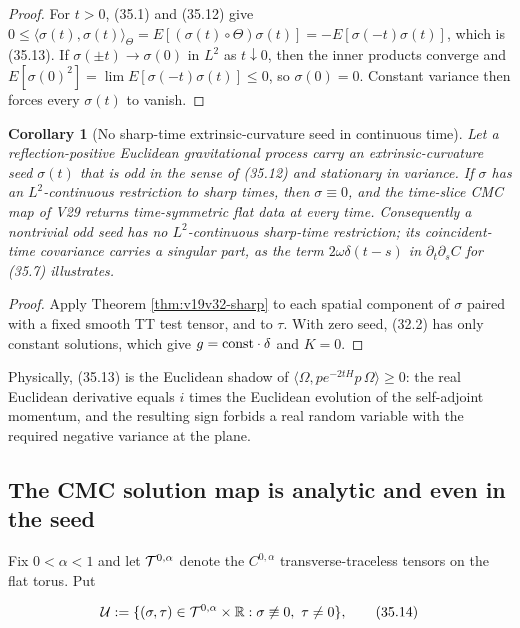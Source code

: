 \documentclass[11pt]{article}
\newtheorem{corollary}[theorem]{Corollary}
\theoremstyle{remark}
\begin{document}
\begin{proof}
For \(t>0\), (35.1) and (35.12) give
\(0\leq\langle\sigma(t),\sigma(t)\rangle_\Theta
=E[(\sigma(t)\circ\Theta)\sigma(t)]=-E[\sigma(-t)\sigma(t)]\), which is
(35.13).  If \(\sigma(\pm t)\to\sigma(0)\) in \(L^2\) as \(t\downarrow0\),
then the inner products converge and
\(E[\sigma(0)^2]=\lim E[\sigma(-t)\sigma(t)]\leq0\), so
\(\sigma(0)=0\).  Constant variance then forces every
\(\sigma(t)\) to vanish.
\end{proof}

\begin{corollary}[No sharp-time extrinsic-curvature seed in continuous time]
\label{cor:v19v32-no-seed}
Let a reflection-positive Euclidean gravitational process carry an
extrinsic-curvature seed \(\sigma(t)\) that is odd in the sense of
(35.12) and stationary in variance.  If \(\sigma\) has an
\(L^2\)-continuous restriction to sharp times, then \(\sigma\equiv0\), and
the time-slice CMC map of V29 returns time-symmetric flat data at every
time.  Consequently a nontrivial odd seed has no \(L^2\)-continuous
sharp-time restriction; its coincident-time covariance carries a singular
part, as the term \(2\omega\delta(t-s)\) in
\(\partial_t\partial_sC\) for (35.7) illustrates.
\end{corollary}

\begin{proof}
Apply Theorem \ref{thm:v19v32-sharp} to each spatial component of
\(\sigma\) paired with a fixed smooth TT test tensor, and to
\(\tau\).  With zero seed, (32.2) has only constant solutions, which give
\(g=\hbox{const}\cdot\delta\) and \(K=0\).
\end{proof}

Physically, (35.13) is the Euclidean shadow of
\(\langle\Omega,pe^{-2tH}p\,\Omega\rangle\geq0\): the real Euclidean
derivative equals \(i\) times the Euclidean evolution of the
self-adjoint momentum, and the resulting sign forbids a real random
variable with the required negative variance at the plane.

\subsection{The CMC solution map is analytic and even in the seed}

Fix \(0<\alpha<1\) and let \({\cal T}^{0,\alpha}\) denote the
\(C^{0,\alpha}\) transverse-traceless tensors on the flat torus.  Put

\[
 {\cal U}:=\{(\sigma,\tau)\in{\cal T}^{0,\alpha}\times\mathbb R:
 \sigma\not\equiv0,\ \tau\neq0\},                                \tag{35.14}
\]
\end{document}
